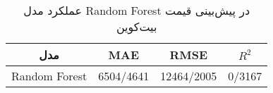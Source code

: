 
        \begin{table}[H]
            \centering
            \begin{tabular}{|c|c|c|c|}
				\hline
                \textbf{مدل} & \textbf{MAE} & \textbf{RMSE} & \textbf{ \(R^2\) } \\
                \hline
                Random Forest & 6504/4641 & 12464/2005 & 0/3167 \\
				\hline
            \end{tabular}
            \caption{عملکرد مدل Random Forest در پیش‌بینی قیمت بیت‌کوین}
            \label{tab:random_forest_performance}
        \end{table}
        